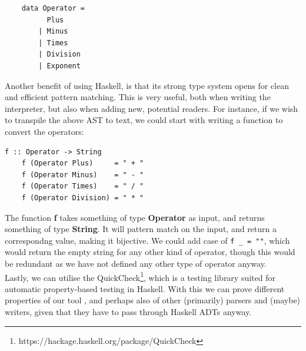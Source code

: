 \begin{verbatim}
    data Operator =
          Plus
        | Minus
        | Times
        | Division
        | Exponent
\end{verbatim}

Another benefit of using Haskell, is that its strong type system opens for clean and efficient pattern matching. This is very useful, both when writing the interpreter, but also when adding new, potential readers. For instance, if we wish to transpile the above AST to text, we could start with writing a function to convert the operators:

\begin{lstlisting}[caption={Haskell example to convert data type to string}, captionpos=b]
    f :: Operator -> String
    f (Operator Plus)     = " + "
    f (Operator Minus)    = " - "
    f (Operator Times)    = " / "
    f (Operator Division) = " * "
\end{lstlisting}

The function \textbf{f} takes something of type \textbf{Operator} as input, and returns something of type \textbf{String}. It will pattern match on the input, and return a correspondng value, making it bijective. We could add case of \texttt{f \_ = ""}, which would return the empty string for any other kind of operator, though this would be redundant as we have not defined any other type of operator anyway. \hfill \\

Lastly, we can utilise the QuickCheck\footnote{https://hackage.haskell.org/package/QuickCheck}, which is a testing library suited for automatic property-based testing in Haskell. With this we can prove different properties of our tool \cite{DBLP:conf/icfp/ClaessenH00}, and perhaps also of other (primarily) parsers and (maybe) writers, given that they have to pass through Haskell ADTs anyway.